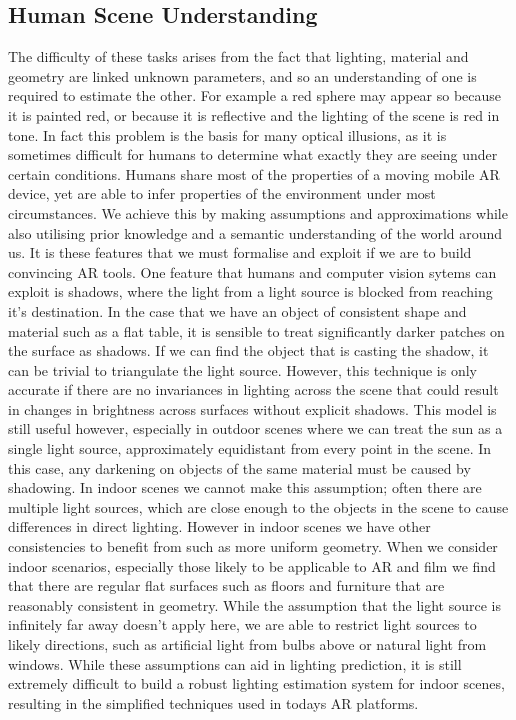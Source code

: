 \documentclass[ %
                    author={Gavin Parker},
                supervisor={Dr. Neill Campbell},
                    degree={MEng},
                     title={Deep Siamese Networks for Illumination Estimation from Stereo Images},
                  subtitle={},
                      type={research},
                      year={2018} ]{dissertation}
\begin{document}
\subsection{Human Scene Understanding}
The difficulty of these tasks arises from the fact that lighting, material and geometry are linked unknown parameters, and so an understanding of one is required to estimate the other. For example a red sphere may appear so because it is painted red, or because it is reflective and the lighting of the scene is red in tone. In fact this problem is the basis for many optical illusions, as it is sometimes difficult for humans to determine what exactly they are seeing under certain conditions. Humans share most of the properties of a moving mobile AR device, yet are able to infer properties of the environment under most circumstances. We achieve this by making assumptions and approximations while also utilising prior knowledge and a semantic understanding of the world around us. It is these features that we must formalise and exploit if we are to build convincing AR tools.
\newline
One feature that humans and computer vision sytems can exploit is shadows, where the light from a light source is blocked from reaching it's destination. In the case that we have an object of consistent shape and material such as a flat table, it is sensible to treat significantly darker patches on the surface as shadows. If we can find the object that is casting the shadow, it can be trivial to triangulate the light source. However, this technique is only accurate if there are no invariances in lighting across the scene that could result in changes in brightness across surfaces without explicit shadows. This model is still useful however, especially in outdoor scenes where we can treat the sun as a single light source, approximately equidistant from every point in the scene. In this case, any darkening on objects of the same material must be caused by shadowing. In indoor scenes we cannot make this assumption; often there are multiple light sources, which are close enough to the objects in the scene to cause differences in direct lighting. However in indoor scenes we have other consistencies to benefit from such as more uniform geometry. When we consider indoor scenarios, especially those likely to be applicable to AR and film we find that there are regular flat surfaces such as floors and furniture that are reasonably consistent in geometry. While the assumption that the light source is infinitely far away doesn't apply here, we are able to restrict light sources to likely directions, such as artificial light from bulbs above or natural light from windows. While these assumptions can aid in lighting prediction, it is still extremely difficult to build a robust lighting estimation system for indoor scenes, resulting in the simplified techniques used in todays AR platforms.
\end{document}
